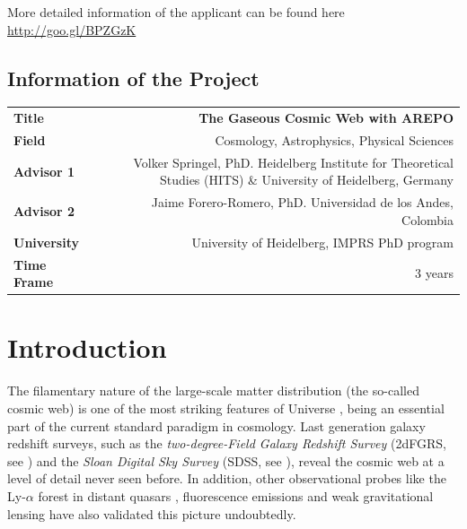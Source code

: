 \documentclass[a4,useAMS,usenatbib,usegraphicx,12pt]{article}
\begin{document}
\vspace{10pt}

More detailed information of the applicant can be found here \url{http://goo.gl/BPZGzK}

\vspace{15pt}  

\subsection*{Information of the Project}
\begin{tabular}{L!{\VRule}R}
\bf Title		& \bf The Gaseous Cosmic Web with AREPO\\
\bf Field		& Cosmology, Astrophysics, Physical Sciences \\
\bf Advisor 1	& Volker Springel, PhD. Heidelberg Institute for Theoretical Studies (HITS) \& University of Heidelberg, Germany \\
\bf Advisor 2	& Jaime Forero-Romero, PhD. Universidad de los Andes, Colombia \\
\bf University	& University of Heidelberg, IMPRS PhD program \\
\bf Time Frame	& 3 years \\
\end{tabular}
\normalsize

\newpage

\section{Introduction}


The filamentary nature of the large-scale matter distribution (the so-called 
cosmic web) is one of the most striking features of Universe \citep{Bond96}, 
being an essential part of the current standard paradigm in cosmology. Last 
generation galaxy redshift surveys, such as the \textit{two-degree-Field Galaxy 
Redshift Survey} (2dFGRS, see \citet{Colless03}) and the \textit{Sloan Digital 
Sky Survey} (SDSS, see \citet{Abazajian09}), reveal the cosmic web at a level 
of detail never seen before. In addition, other observational probes like the 
Ly-$\alpha$ forest in distant quasars \citep{Rauch98, Cantalupo14}, 
fluorescence emissions \citep{Cantalupo12} and weak gravitational lensing 
\citep{Massey07, Dietrich12} have also validated this picture undoubtedly.

\
\end{document}
